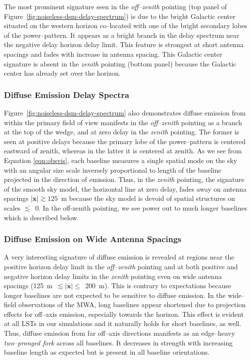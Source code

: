 \documentclass[preprint2,iop,numberedappendix]{emulateapj}
\begin{document}
The most prominent signature seen in the {\it off--zenith} pointing (top panel of Figure~\ref{fig:noiseless-dsm-delay-spectrum}) is due to the bright Galactic center situated on the western horizon co--located with one of the bright secondary lobes of the power--pattern. It appears as a bright branch in the delay spectrum near the negative delay horizon delay limit. This feature is strongest at short antenna spacings and fades with increase in antenna spacing. This Galactic center signature is absent in the {\it zenith} pointing (bottom panel) because the Galactic center has already set over the horizon. 

\subsubsection{Diffuse Emission Delay Spectra}\label{sec:diffuse-features}

Figure~\ref{fig:noiseless-dsm-delay-spectrum} also demonstrates diffuse emission from within the primary field of view manifests in the {\it off--zenith} pointing as a branch at the top of the wedge, and at zero delay in the {\it zenith} pointing. The former is seen at positive delays because the primary lobe of the power--pattern is centered eastward of zenith, whereas in the latter it is centered at zenith. As we see from Equation \ref{eqn:obsvis}, each baseline measures a single spatial mode on the sky with an angular size scale inversely proportional to length of the baseline projected in the direction of emission. Thus, in the {\it zenith} pointing, the signature of the smooth sky model, the horizontal line at zero delay, fades away on antenna spacings $|\overline{\mathbf{x}}| \gtrsim 125$~m because the sky model is devoid of spatial structures on scales $\lesssim$~0. In the off-zenith pointing, we see power out to much longer baselines which is described below.

\subsubsection{Diffuse Emission on Wide Antenna Spacings}\label{sec:diffuse-long-baselines}

A very interesting signature of diffuse emission is revealed at regions near the positive horizon delay limit in the {\it off--zenith} pointing and at both positive and negative horizon delay limits in the {\it zenith} pointing even on wide antenna spacings (125~m~$\lesssim |\overline{\mathbf{x}}|\le$~200~m). This is contrary to expectations because longer baselines are not expected to be sensitive to diffuse emission. In the wide--field observations of the MWA, long baselines appear shortened due to projection effects for off--axis emission, especially towards the horizon.  This effect is evident at all LSTs in our simulations and it naturally holds for short baselines, as well. Thus, diffuse emission from far off--axis directions manifests as an edge--heavy {\it two--pronged fork} across all baselines. It decreases in strength with increasing baseline length as expected but is present in all baseline orientations.   %
\end{document}
